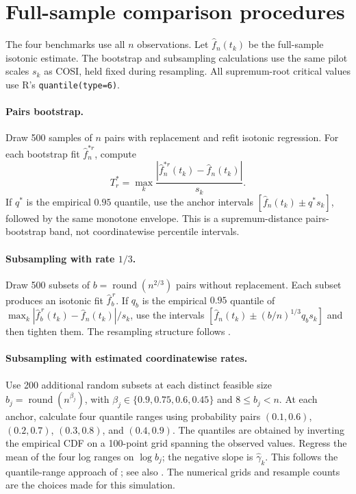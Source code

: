 \documentclass[10pt]{article}
\begin{document}
\section{Full-sample comparison procedures}
The four benchmarks use all $n$ observations. Let $\widehat f_n(t_k)$ be the full-sample isotonic estimate. The bootstrap and subsampling calculations use the same pilot scales $s_k$ as COSI, held fixed during resampling. All supremum-root critical values use R's \texttt{quantile(type=6)}.

\paragraph{Pairs bootstrap.}
Draw 500 samples of $n$ pairs with replacement and refit isotonic regression. For each bootstrap fit $\widehat f_n^{*r}$, compute
\[
 T_r^*=\max_k\frac{|\widehat f_n^{*r}(t_k)-\widehat f_n(t_k)|}{s_k}.
\]
If $q^*$ is the empirical $0.95$ quantile, use the anchor intervals $[\widehat f_n(t_k)\pm q^*s_k]$, followed by the same monotone envelope. This is a supremum-distance pairs-bootstrap band, not coordinatewise percentile intervals.

\paragraph{Subsampling with rate $1/3$.}
Draw 500 subsets of $b=\operatorname{round}(n^{2/3})$ pairs without replacement. Each subset produces an isotonic fit $\widehat f_b^{\,r}$. If $q_b$ is the empirical $0.95$ quantile of
$\max_k|\widehat f_b^{\,r}(t_k)-\widehat f_n(t_k)|/s_k$, use the intervals
$[\widehat f_n(t_k)\pm (b/n)^{1/3}q_bs_k]$ and then tighten them. The resampling structure follows \cite[Chapter~2, pp.~39--64]{politis1999subsampling}.

\paragraph{Subsampling with estimated coordinatewise rates.}
Use 200 additional random subsets at each distinct feasible size
$b_j=\operatorname{round}(n^{\beta_j})$, with
$\beta_j\in\{0.9,0.75,0.6,0.45\}$ and $8\le b_j<n$. At each anchor, calculate four quantile ranges using probability pairs $(0.1,0.6)$, $(0.2,0.7)$, $(0.3,0.8)$, and $(0.4,0.9)$. The quantiles are obtained by inverting the empirical CDF on a 100-point grid spanning the observed values. Regress the mean of the four log ranges on $\log b_j$; the negative slope is $\widehat\gamma_k$. This follows the quantile-range approach of \cite{bertail1999subsampling}; see also \cite[Chapter~8, pp.~173--187]{politis1999subsampling}. The numerical grids and resample counts are the choices made for this simulation.
\end{document}
